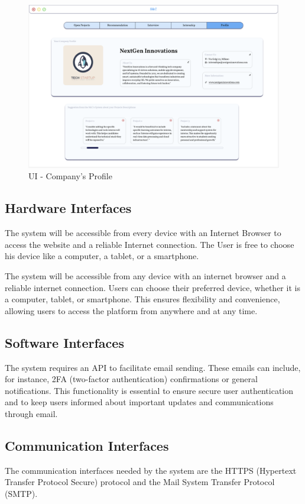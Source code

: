 \begin{figure}[H]
    \centering
    \includegraphics[width=0.8\linewidth]{RASD//Images/UI - Company's Profile.png}
    \caption{UI - Company's Profile}
\end{figure}

\pagebreak
\subsection{Hardware Interfaces}
The system will be accessible from every device with an Internet Browser to access the website and a reliable Internet connection. The User is free to choose his device like a computer, a tablet, or a smartphone.

The system will be accessible from any device with an internet browser and a reliable internet connection. Users can choose their preferred device, whether it is a computer, tablet, or smartphone. This ensures flexibility and convenience, allowing users to access the platform from anywhere and at any time.

\subsection{Software Interfaces}
The system requires an API to facilitate email sending. These emails can include, for instance, 2FA (two-factor authentication) confirmations or general notifications. This functionality is essential to ensure secure user authentication and to keep users informed about important updates and communications through email.
 
\subsection{Communication Interfaces}
The communication interfaces needed by the system are the HTTPS (Hypertext Transfer Protocol Secure) protocol and the Mail System Transfer Protocol (SMTP). 


